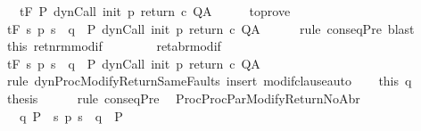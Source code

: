 \begin{isabellebody}
\ \ \ {\isachardoublequoteopen}{\isasymGamma}{\isacharcomma}{\isasymTheta}{\isasymturnstile}\isactrlsub t\isactrlbsub {\isacharslash}F\isactrlesub \ P\ {\isacharparenleft}dynCall\ init\ p\ return\ c{\isacharparenright}\ Q{\isacharcomma}A{\isachardoublequoteclose}\isanewline
%
\isadelimproof
%
\endisadelimproof
%
\isatagproof
{}\isamarkupfalse%
\ {\isacharminus}\isanewline
\ \ \isamarkupfalse%
\ to{\isacharunderscore}prove\ \isanewline
\ \ \isamarkupfalse%
\ {\isachardoublequoteopen}{\isasymGamma}{\isacharcomma}{\isasymTheta}{\isasymturnstile}\isactrlsub t\isactrlbsub {\isacharslash}F\isactrlesub \ {\isacharparenleft}{\isacharbraceleft}s{\isachardot}\ p\ s\ {\isacharequal}\ q{\isacharbraceright}\ {\isasyminter}\ P{\isacharprime}{\isacharparenright}\ {\isacharparenleft}dynCall\ init\ p\ return{\isacharprime}\ c{\isacharparenright}\ Q{\isacharcomma}A{\isachardoublequoteclose}\isanewline
\ \ \ \ \isamarkupfalse%
\ {\isacharparenleft}rule\ conseqPre{\isacharparenright}\ blast\isanewline
\ \ \isamarkupfalse%
\ this\ ret{\isacharunderscore}nrm{\isacharunderscore}modif\ \isanewline
\ \ \ \ \ \ \ ret{\isacharunderscore}abr{\isacharunderscore}modif\ \isanewline
\ \ \isamarkupfalse%
\ {\isachardoublequoteopen}{\isasymGamma}{\isacharcomma}{\isasymTheta}{\isasymturnstile}\isactrlsub t\isactrlbsub {\isacharslash}F\isactrlesub \ {\isacharparenleft}{\isacharbraceleft}s{\isachardot}\ p\ s\ {\isacharequal}\ q{\isacharbraceright}\ {\isasyminter}\ P{\isacharprime}{\isacharparenright}\ {\isacharparenleft}dynCall\ init\ p\ return\ c{\isacharparenright}\ Q{\isacharcomma}A{\isachardoublequoteclose}\isanewline
\ \ \ \ \isamarkupfalse%
\ {\isacharparenleft}rule\ dynProcModifyReturnSameFaults{\isacharparenright}\ {\isacharparenleft}insert\ modif{\isacharunderscore}clause{\isacharcomma}auto{\isacharparenright}\isanewline
\ \ \isamarkupfalse%
\ this\ q\ \isamarkupfalse%
\ {\isacharquery}thesis\isanewline
\ \ \ \ \isamarkupfalse%
\ {\isacharparenleft}rule\ conseqPre{\isacharparenright}\ \isanewline
{}\isamarkupfalse%
%
\endisatagproof
{\isafoldproof}%
%
\isadelimproof
\isanewline
%
\endisadelimproof
\isanewline
{}\isamarkupfalse%
\ ProcProcParModifyReturnNoAbr{\isacharcolon}\ \isanewline
\ \ \ q{\isacharcolon}\ {\isachardoublequoteopen}P\ {\isasymsubseteq}\ {\isacharbraceleft}s{\isachardot}\ p\ s\ {\isacharequal}\ q{\isacharbraceright}\ {\isasyminter}\ P{\isacharprime}{\isachardoublequoteclose}\isanewline

\end{isabellebody}
